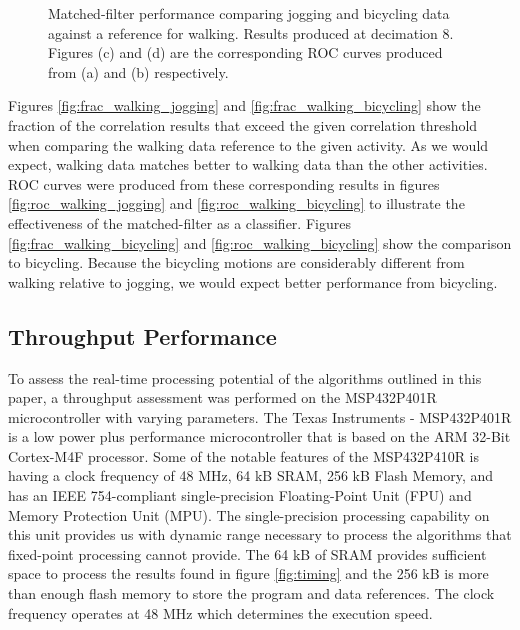 \documentclass[journal]{IEEEtran}
\begin{document}
\begin{figure}[!ht]
  \quad
  \caption{Matched-filter performance comparing jogging and bicycling data against a reference for walking. Results produced at decimation 8. Figures (c) and (d) are the corresponding ROC curves produced from (a) and (b) respectively.}
  \label{fig:MF_performance}
\end{figure}
%
Figures \ref{fig:frac_walking_jogging} and \ref{fig:frac_walking_bicycling} show the fraction of the correlation results that exceed the given correlation threshold when comparing the walking data reference to the given activity.
As we would expect, walking data matches better to walking data than the other activities.
ROC curves were produced from these corresponding results in figures \ref{fig:roc_walking_jogging} and \ref{fig:roc_walking_bicycling} to illustrate the effectiveness of the matched-filter as a classifier.
Figures \ref{fig:frac_walking_bicycling} and \ref{fig:roc_walking_bicycling} show the comparison to bicycling.
Because the bicycling motions are considerably different from walking relative to jogging, we would expect better performance from bicycling.
%
%
\subsection{Throughput Performance}
%
To assess the real-time processing potential of the algorithms outlined in this paper, a throughput assessment was performed on the MSP432P401R microcontroller with varying parameters.
The Texas Instruments - MSP432P401R is a low power plus performance microcontroller that is based on the ARM 32-Bit Cortex-M4F processor.
Some of the notable features of the MSP432P410R is having a clock frequency of 48 MHz, 64 kB SRAM, 256 kB Flash Memory, and has an IEEE 754-compliant single-precision Floating-Point Unit (FPU) and Memory Protection Unit (MPU).
The single-precision processing capability on this unit provides us with dynamic range necessary to process the algorithms that fixed-point processing cannot provide.
The 64 kB of SRAM provides sufficient space to process the results found in figure \ref{fig:timing} and
the 256 kB is more than enough flash memory to store the program and data references.
The clock frequency operates at 48 MHz which determines the execution speed.
\end{document}
